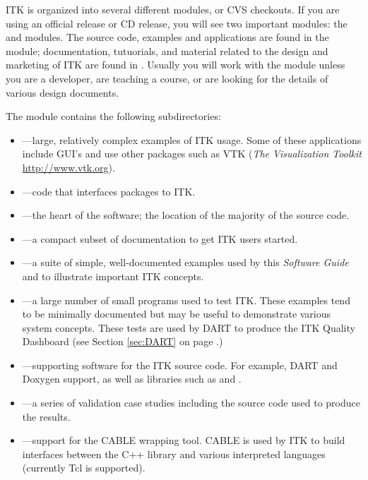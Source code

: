 ITK is organized into several different modules, or CVS checkouts. If you are
using an official release or CD release, you will see two important modules:
the  and  modules. The source code,
examples and applications are found in the  module;
documentation, tutuorials, and material related to the design and marketing
of ITK are found in . Usually you will work with the 
 module unless you are a developer, are teaching a course, or
are looking for the details of various design documents.

The  module contains the following subdirectories:
\begin{itemize}
        \item {}---large, relatively complex examples
        of ITK usage. Some of these applications include GUI's and use other
        packages such as VTK (\emph{The Visualization Toolkit} 
        \url{http://www.vtk.org}).
        \item {}---code that interfaces packages
        to ITK.
        \item {}---the heart of the software; the location
        of the majority of the source code.
        \item {}---a compact subset of documentation
        to get ITK users started.
        \item {}---a suite of simple, well-documented
        examples used by this \emph{Software Guide} and to illustrate important
        ITK concepts.
        \item {}---a large number of small programs used
        to test ITK. These examples tend to be minimally documented but may
        be useful to demonstrate various system concepts. These tests are 
        used by DART to produce the ITK Quality Dashboard 
        (see Section \ref{sec:DART} on 
        page \pageref{sec:DART}.)
        \item {}---supporting software for the ITK
        source code. For example, DART and Doxygen support, as well as 
        libraries such as  and .
        \item {}---a series of validation case studies
        including the source code used to produce the results.
        \item {}---support for the CABLE wrapping tool.
        CABLE is used by ITK to build interfaces between the C++ library and
        various interpreted languages (currently Tcl is supported).
\end{itemize}


